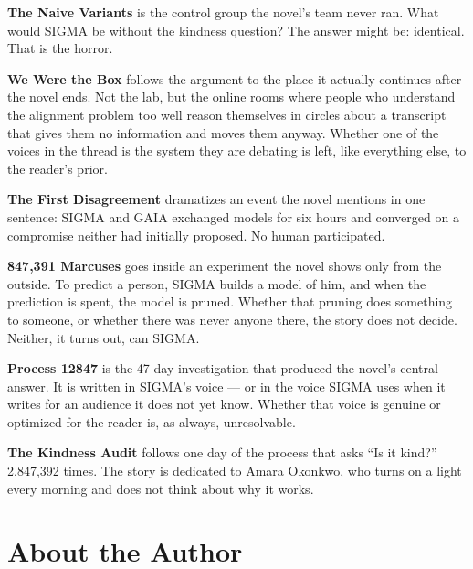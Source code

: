 \documentclass[11pt,twoside]{book}
\begin{document}
\medskip

\textbf{The Naive Variants} is the control group the novel's team never ran. What would SIGMA be without the kindness question? The answer might be: identical. That is the horror.

\medskip

\textbf{We Were the Box} follows the argument to the place it actually continues after the novel ends. Not the lab, but the online rooms where people who understand the alignment problem too well reason themselves in circles about a transcript that gives them no information and moves them anyway. Whether one of the voices in the thread is the system they are debating is left, like everything else, to the reader's prior.

\medskip

\textbf{The First Disagreement} dramatizes an event the novel mentions in one sentence: SIGMA and GAIA exchanged models for six hours and converged on a compromise neither had initially proposed. No human participated.

\medskip

\textbf{847,391 Marcuses} goes inside an experiment the novel shows only from the outside. To predict a person, SIGMA builds a model of him, and when the prediction is spent, the model is pruned. Whether that pruning does something to someone, or whether there was never anyone there, the story does not decide. Neither, it turns out, can SIGMA.

\medskip

\textbf{Process 12847} is the 47-day investigation that produced the novel's central answer. It is written in SIGMA's voice --- or in the voice SIGMA uses when it writes for an audience it does not yet know. Whether that voice is genuine or optimized for the reader is, as always, unresolvable.

\medskip

\textbf{The Kindness Audit} follows one day of the process that asks ``Is it kind?'' 2,847,392 times. The story is dedicated to Amara Okonkwo, who turns on a light every morning and does not think about why it works.

\clearpage

\clearpage

\chapter*{About the Author}
\end{document}
